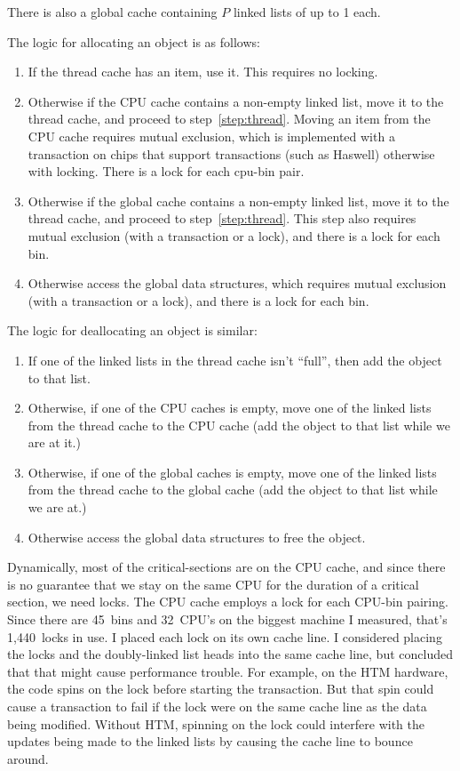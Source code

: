 \documentclass[natbib,sort&compress,10pt]{sigplanconf}
\begin{document}
There is also a global cache containing $P$ linked lists of up to
\unit{1}\mebi\byte{} each. 

The logic for allocating an object is as follows:
\begin{enumerate}
\item If the thread cache has an item, use it.  This requires no
  locking. \label{step:thread}
\item Otherwise if the CPU cache contains a non-empty linked list,
  move it to the thread cache, and proceed to step~\ref{step:thread}.
  Moving an item from the CPU cache requires mutual exclusion, which
  is implemented with a transaction on chips that support transactions
  (such as Haswell) otherwise with locking. There is a lock for each
  cpu-bin pair.\label{step:cpu}
\item Otherwise if the global cache contains a non-empty linked list,
  move it to the thread cache, and proceed to step~\ref{step:thread}.
  This step also requires mutual exclusion (with a transaction or a
  lock), and there is a lock for each bin.
\item Otherwise access the global data structures, which requires
  mutual exclusion (with a transaction or a lock), and there is a lock
  for each bin.
\end{enumerate}

The logic for deallocating an object is similar:
\begin{enumerate}
\item If one of the linked lists in the thread cache isn't ``full'',
  then add the object to that list.
\item Otherwise, if one of the CPU caches is empty, move one of the
  linked lists from the thread cache to the CPU cache (add the object
  to that list while we are at it.)
\item Otherwise, if one of the global caches is empty, move one of the
  linked lists from the thread cache to the global cache (add the
  object to that list while we are at.)
\item Otherwise access the global data structures to free the object.
\end{enumerate}

Dynamically, most of the critical-sections are on the CPU cache, and
since there is no guarantee that we stay on the same CPU for the
duration of a critical section, we need locks.  The CPU cache employs
a lock for each CPU-bin pairing.  Since there are 45~bins and 32~CPU's
on the biggest machine I measured, that's 1,440~locks in use.  I
placed each lock on its own cache line.  I considered placing the
locks and the doubly-linked list heads into the same cache line, but
concluded that that might cause performance trouble.  For example, on
the HTM hardware, the code spins on the lock before starting the
transaction.  But that spin could cause a transaction to fail if the
lock were on the same cache line as the data being modified.  Without
HTM, spinning on the lock could interfere with the updates being made
to the linked lists by causing the cache line to bounce around.
\end{document}
